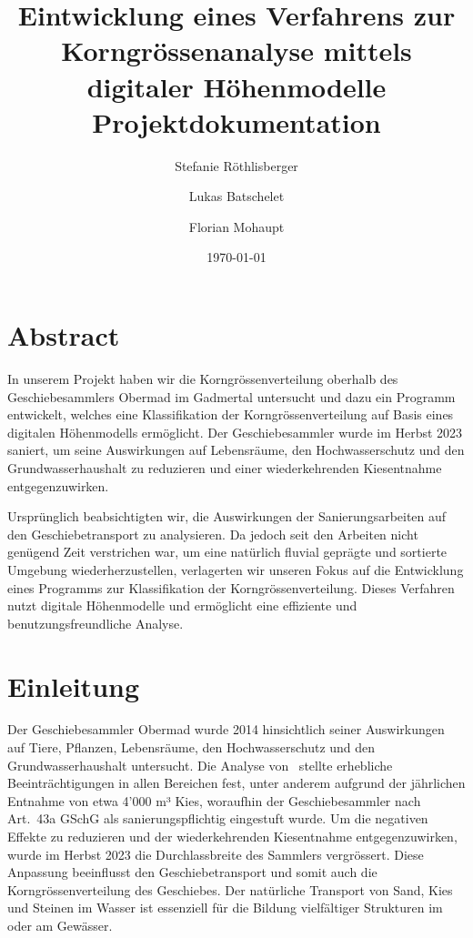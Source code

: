\documentclass[10pt]{extarticle}
\title{%
    Eintwicklung eines Verfahrens zur Korngrössenanalyse mittels digitaler Höhenmodelle\\
    \normalsize Projektdokumentation}
\author[1]{Stefanie Röthlisberger}
\author[2]{Lukas Batschelet}
\author[3]{Florian Mohaupt}
\affil[1]{stefanie.roethlisberger2@students.unibe.ch, 20-924-346}
\affil[2]{lukas.batschelet@students.unibe.ch, 16-499-733}
\affil[3]{florian.mohaupt@students.unibe.ch, 22-125-041}
\date{\today}
\begin{document}
\maketitle

\section*{Abstract}
    In unserem Projekt haben wir die Korngrössenverteilung oberhalb des Geschiebesammlers Obermad im Gadmertal untersucht und dazu ein Programm entwickelt, welches eine Klassifikation der Korngrössenverteilung auf Basis eines digitalen Höhenmodells ermöglicht.
    Der Geschiebesammler wurde im Herbst 2023 saniert, um seine Auswirkungen auf Lebensräume, den Hochwasserschutz und den Grundwasserhaushalt zu reduzieren und einer wiederkehrenden Kiesentnahme entgegenzuwirken.

    Ursprünglich beabsichtigten wir, die Auswirkungen der Sanierungsarbeiten auf den Geschiebetransport zu analysieren.
    Da jedoch seit den Arbeiten nicht genügend Zeit verstrichen war, um eine natürlich fluvial geprägte und sortierte Umgebung wiederherzustellen, verlagerten wir unseren Fokus auf die Entwicklung eines Programms zur Klassifikation der Korngrössenverteilung.
    Dieses Verfahren nutzt digitale Höhenmodelle und ermöglicht eine effiziente und benutzungsfreundliche Analyse.

\section{Einleitung}\label{sec:einleitung}

    Der Geschiebesammler Obermad wurde 2014 hinsichtlich seiner Auswirkungen auf Tiere, Pflanzen, Lebensräume, den Hochwasserschutz und den Grundwasserhaushalt untersucht.
    Die Analyse von~\cite{hunzingerGewaesserentwicklungskonzeptBernGEKOBE2014} stellte erhebliche Beeinträchtigungen in allen Bereichen fest, unter anderem aufgrund der jährlichen Entnahme von etwa 4'000 m³ Kies, woraufhin der Geschiebesammler nach Art.\ 43a GSchG als sanierungspflichtig eingestuft wurde.
    Um die negativen Effekte zu reduzieren und der wiederkehrenden Kiesentnahme entgegenzuwirken, wurde im Herbst 2023 die Durchlassbreite des Sammlers vergrössert.
    Diese Anpassung beeinflusst den Geschiebetransport und somit auch die Korngrössenverteilung des Geschiebes.
    Der natürliche Transport von Sand, Kies und Steinen im Wasser ist essenziell für die Bildung vielfältiger Strukturen im oder am Gewässer.
\end{document}
